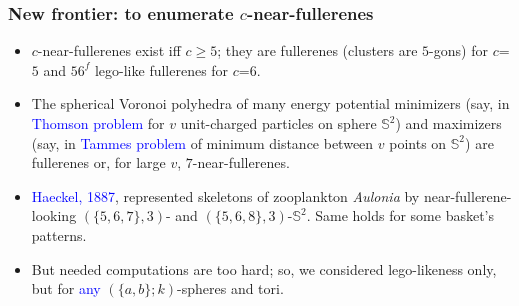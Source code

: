 \documentclass{beamer}
\begin{document}
\begin{frame}\frametitle{New frontier: to enumerate $c$-near-fullerenes}
\begin{itemize}

\item $c$-near-fullerenes exist iff $c$$\ge $$5$; they are
 fullerenes (clusters are  $5$-gons) for $c$=$5$ and $56^f$
 lego-like fullerenes for $c$=$6$.

\item  The spherical Voronoi polyhedra of many
 energy potential minimizers
 (say, in \textcolor{blue}{Thomson problem} for
$v$ unit-charged particles on sphere $\mathbb{S}^2$) and 
  maximizers 
  (say, in \textcolor{blue}{Tammes problem}
of minimum distance between $v$ points on $\mathbb{S}^2$)  are  fullerenes or, for large $v$,  $7$-near-fullerenes.

\item  \textcolor{blue}{Haeckel, 1887}, represented
 skeletons of 
 zooplankton {\em Aulonia}
 by near-fullerene-looking $(\{5, 6, 7\}, 3)$- and $(\{5,6, 8\}, 3)$-$\mathbb{S}^2$.
 Same holds for some basket's patterns.
\item But needed computations are too hard; so, we considered lego-likeness only, but for  \textcolor{blue}{any}
$(\{a,b\}; k)$-spheres and tori.

\end{itemize} 
\end{frame}
\end{document}
